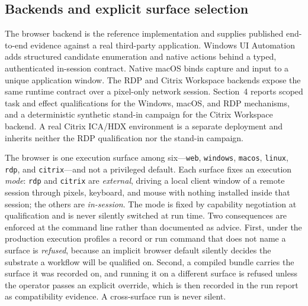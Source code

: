 \subsection{Backends and explicit surface selection}
The browser backend is the reference implementation and supplies published
end-to-end evidence against a real third-party application. Windows UI
Automation adds structured candidate enumeration and native actions behind a
typed, authenticated in-session contract. Native macOS binds capture and input
to a unique application window. The RDP and Citrix Workspace backends expose the
same runtime contract over a pixel-only network session. Section~4 reports
scoped task and effect qualifications for the Windows, macOS, and RDP
mechanisms, and a deterministic synthetic stand-in campaign for the Citrix
Workspace backend. A real Citrix ICA/HDX environment is a separate deployment
and inherits neither the RDP qualification nor the stand-in campaign.

The browser is one execution surface among six---\texttt{web},
\texttt{windows}, \texttt{macos}, \texttt{linux}, \texttt{rdp}, and
\texttt{citrix}---and not a privileged default. Each surface fixes an execution
\emph{mode}: \texttt{rdp} and \texttt{citrix} are \emph{external}, driving a
local client window of a remote session through pixels, keyboard, and mouse with
nothing installed inside that session; the others are \emph{in-session}. The
mode is fixed by capability negotiation at qualification and is never silently
switched at run time. Two consequences are enforced at the command line rather
than documented as advice. First, under the production execution profiles a
record or run command that does not name a surface is \emph{refused}, because an
implicit browser default silently decides the substrate a workflow will be
qualified on. Second, a compiled bundle carries the surface it was recorded on,
and running it on a different surface is refused unless the operator passes an
explicit override, which is then recorded in the run report as compatibility
evidence. A cross-surface run is never silent.
